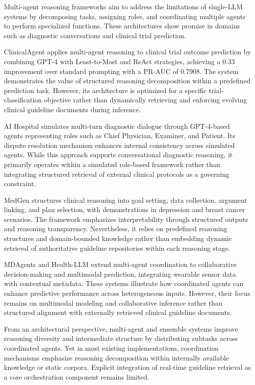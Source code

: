 \documentclass[preprint,12pt]{elsarticle}
\begin{document}
Multi-agent reasoning frameworks aim to address the limitations of single-LLM systems by decomposing tasks, assigning roles, and coordinating multiple agents to perform specialized functions. These architectures show promise in domains such as diagnostic conversations and clinical trial prediction.

ClinicalAgent \cite{r20} applies multi-agent reasoning to clinical trial outcome prediction by combining GPT-4 with Least-to-Most and ReAct strategies, achieving a 0.33 improvement over standard prompting with a PR-AUC of 0.7908. The system demonstrates the value of structured reasoning decomposition within a predefined prediction task. However, its architecture is optimized for a specific trial-classification objective rather than dynamically retrieving and enforcing evolving clinical guideline documents during inference.

AI Hospital \cite{r21} simulates multi-turn diagnostic dialogue through GPT-4-based agents representing roles such as Chief Physician, Examiner, and Patient. Its dispute resolution mechanism enhances internal consistency across simulated agents. While this approach supports conversational diagnostic reasoning, it primarily operates within a simulated role-based framework rather than integrating structured retrieval of external clinical protocols as a governing constraint.

MedGen \cite{r22} structures clinical reasoning into goal setting, data collection, argument linking, and plan selection, with demonstrations in depression and breast cancer scenarios. The framework emphasizes interpretability through structured outputs and reasoning transparency. Nevertheless, it relies on predefined reasoning structures and domain-bounded knowledge rather than embedding dynamic retrieval of authoritative guideline repositories within each reasoning stage.

MDAgents and Health-LLM \cite{r23} extend multi-agent coordination to collaborative decision-making and multimodal prediction, integrating wearable sensor data with contextual metadata. These systems illustrate how coordinated agents can enhance predictive performance across heterogeneous inputs. However, their focus remains on multimodal modeling and collaborative inference rather than structured alignment with externally retrieved clinical guideline documents.

From an architectural perspective, multi-agent and ensemble systems improve reasoning diversity and intermediate structure by distributing subtasks across coordinated agents. Yet in most existing implementations, coordination mechanisms emphasize reasoning decomposition within internally available knowledge or static corpora. Explicit integration of real-time guideline retrieval as a core orchestration component remains limited.
\end{document}
